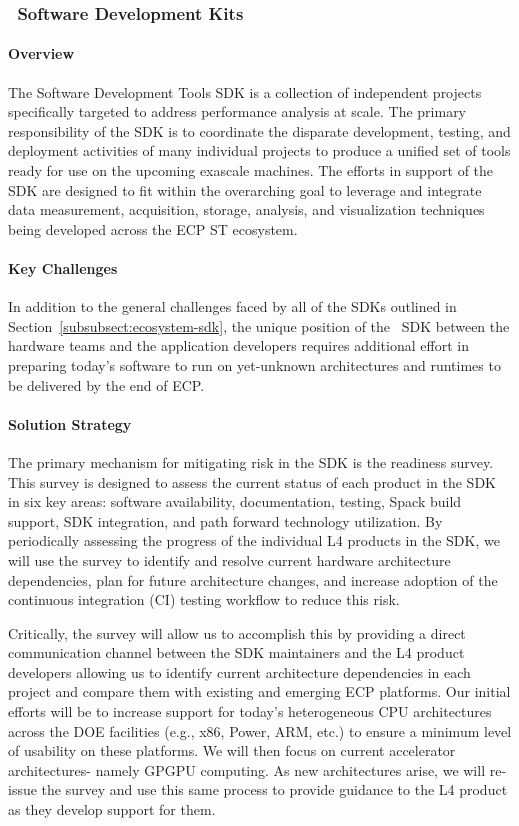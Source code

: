 \subsubsection{ \tools\ Software Development Kits} 

\paragraph{Overview}
The Software Development Tools SDK is a collection of independent projects specifically targeted to address performance analysis at scale. The primary responsibility of the SDK is to coordinate the disparate development, testing, and deployment activities of many individual projects to produce a unified set of tools ready for use on the upcoming exascale machines. The efforts in support of the SDK are designed to fit within the overarching goal to leverage and integrate data measurement, acquisition, storage, analysis, and visualization techniques being developed across the ECP ST ecosystem.


\paragraph{Key Challenges}
In addition to the general challenges faced by all of the SDKs outlined in Section~\ref{subsubsect:ecosystem-sdk}, the unique position of the \tools\ SDK between the hardware teams and the application developers requires additional effort in preparing today’s software to run on yet-unknown architectures and runtimes to be delivered by the end of ECP.

\paragraph{Solution Strategy}
The primary mechanism for mitigating risk in the SDK is the readiness survey. This survey is designed to assess the current status of each product in the SDK in six key areas: software availability, documentation, testing, Spack build support, SDK integration, and path forward technology utilization. By periodically assessing the progress of the individual L4 products in the SDK, we will use the survey to identify and resolve current hardware architecture dependencies, plan for future architecture changes, and increase adoption of the continuous integration (CI) testing workflow to reduce this risk.

Critically, the survey will allow us to accomplish this by providing a direct communication channel between the SDK maintainers and the L4 product developers allowing us to identify current architecture dependencies in each project and compare them with existing and emerging ECP platforms. Our initial efforts will be to increase support for today’s heterogeneous CPU architectures across the DOE facilities (e.g., x86, Power, ARM, etc.) to ensure a minimum level of usability on these platforms. We will then focus on current accelerator architectures- namely GPGPU computing. As new architectures arise, we will re-issue the survey and use this same process to provide guidance to the L4 product as they develop support for them.

